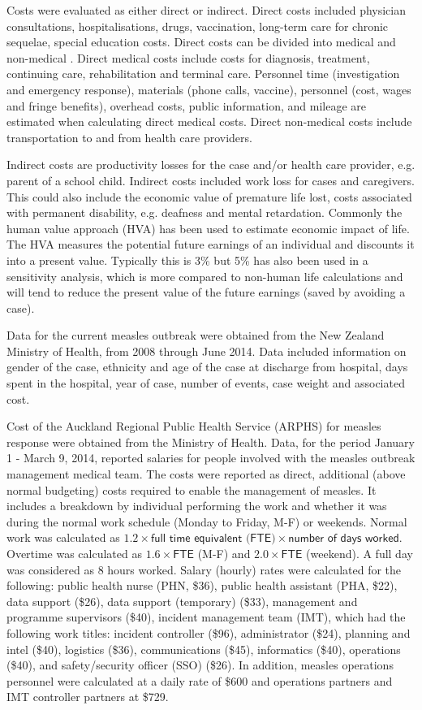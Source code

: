 \documentclass{article}
\begin{document}
\begin{itemize}
Costs were evaluated as either direct or indirect. Direct costs included physician consultations, hospitalisations, drugs, vaccination, long-term care for chronic sequelae, special education costs. Direct costs can be divided into medical and non-medical \citep{saha13}. Direct medical costs include costs for diagnosis, treatment, continuing care, rehabilitation and terminal care. Personnel time (investigation and emergency response), materials (phone calls, vaccine), personnel (cost, wages and fringe benefits), overhead costs, public information, and mileage are estimated when calculating direct medical costs. Direct non-medical costs include transportation to and from health care providers.

Indirect costs are productivity losses for the case and/or health care provider, e.g. parent of a school child. Indirect costs included work loss for cases and caregivers. This could also include the economic value of premature life lost, costs associated with permanent disability, e.g. deafness and mental retardation. Commonly the human value approach (HVA) has been used to estimate economic impact of life. The HVA measures the potential future earnings of an individual and discounts it into a present value. Typically this is 3\% but 5\% has also been used in a sensitivity analysis, which is more compared to non-human life calculations and will tend to reduce the present value of the future earnings (saved by avoiding a case).

Data for the current measles outbreak were obtained from the New Zealand Ministry of Health, from 2008 through June 2014. Data included information on gender of the case, ethnicity and age of the case at discharge from hospital, days spent in the hospital, year of case, number of events, case weight and associated cost.

Cost of the Auckland Regional Public Health Service (ARPHS) for measles response were obtained from the Ministry of Health. Data, for the period January 1 - March 9, 2014, reported salaries for people involved with the measles outbreak management medical team. The costs were reported as direct, additional (above normal budgeting) costs required to enable the management of measles. It includes a breakdown by individual performing the work and whether it was during the normal work schedule (Monday to Friday, M-F) or weekends. Normal work was calculated as $1.2 \times \textsf{full time equivalent (FTE)} \times \textsf{number of days worked}$. Overtime was calculated as $1.6\times\textsf{FTE}$ (M-F) and $2.0 \times \textsf{FTE}$ (weekend). A full day was considered as 8 hours worked. Salary (hourly) rates were calculated for the following: public health nurse (PHN, \$36), public health assistant (PHA, \$22), data support (\$26), data support (temporary) (\$33), management and programme supervisors (\$40), incident management team (IMT), which had the following work titles: incident controller (\$96), administrator (\$24), planning and intel (\$40), logistics (\$36), communications (\$45), informatics (\$40), operations (\$40), and safety/security officer (SSO) (\$26). In addition, measles operations personnel were calculated at a daily rate of \$600 and operations partners and IMT controller partners at \$729.


\end{itemize}
\end{document}
